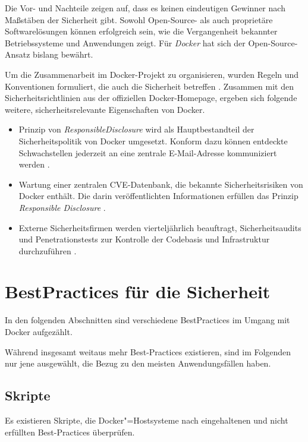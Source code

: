 \documentclass[../main.tex]{subfiles}
\begin{document}
    Die Vor- und Nachteile zeigen auf, dass es keinen eindeutigen Gewinner nach Maßstäben der Sicherheit gibt. Sowohl Open-Source- als auch proprietäre Softwarelösungen können erfolgreich sein, wie die Vergangenheit bekannter Betriebssysteme und Anwendungen zeigt. Für \emph{Docker} hat sich der Open-Source-Ansatz bislang bewährt.

    Um die Zusammenarbeit im Docker-Projekt zu organisieren, wurden Regeln und Konventionen formuliert, die auch die Sicherheit betreffen \cite{githubDockerContribution}. Zusammen mit den Sicherheitsrichtlinien aus der offiziellen Docker-Homepage, ergeben sich folgende weitere, sicherheitsrelevante Eigenschaften von Docker.

    \begin{itemize}
      \item Prinzip von \emph{\gls{ResponsibleDisclosure}} wird als Hauptbestandteil der Sicherheitspolitik von Docker umgesetzt. Konform dazu können entdeckte Schwachstellen jederzeit an eine zentrale E-Mail-Adresse kommuniziert werden \cite{dockerSecurityPortal}.
      \item Wartung einer zentralen \acrshort{CVE}-Datenbank, die bekannte Sicherheitsrisiken von Docker enthält. Die darin veröffentlichten Informationen erfüllen das Prinzip \emph{Responsible Disclosure} \cite{dockerCVEList}.
      \item Externe Sicherheitsfirmen werden vierteljährlich beauftragt, Sicherheitsaudits und Penetrationstests zur Kontrolle der Codebasis und Infrastruktur durchzuführen \cite[S.5]{dockerSecIntro}.
    \end{itemize}

  \section{\glspl{BestPractice} für die Sicherheit}
    In den folgenden Abschnitten sind verschiedene \glspl{BestPractice} im Umgang mit Docker aufgezählt.

    Während insgesamt weitaus mehr Best-Practices existieren, sind im Folgenden nur jene ausgewählt, die Bezug zu den meisten Anwendungsfällen haben.

    \subsection{Skripte}
      Es existieren Skripte, die Docker"=Hostsysteme nach eingehaltenen und nicht erfüllten Best-Practices überprüfen.
\end{document}
